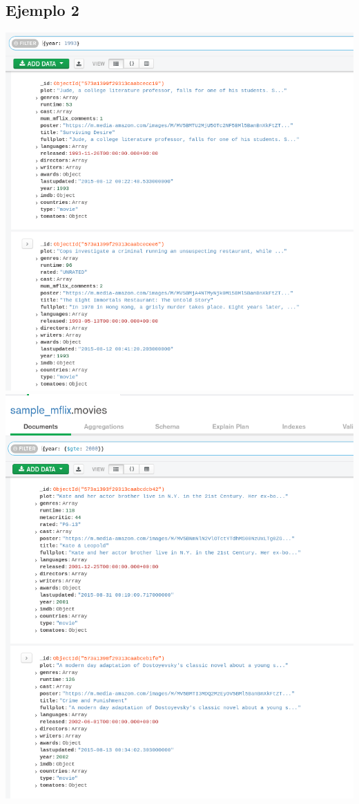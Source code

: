 \documentclass[10pt]{article}
\begin{document}
\subsection{Ejemplo 2}
\begin{center}
  \includegraphics[scale=0.35]{imgs/ej2_1.png}\\
  \includegraphics[scale=0.35]{imgs/ej2_2.png}\\

\end{center}
\end{document}
